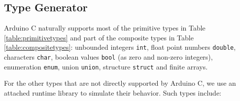 \subsection{Type Generator}

Arduino C naturally supports most of the primitive types in Table \ref{table:primitivetypes} and part of the composite types in Table \ref{table:compositetypes}: unbounded integers \texttt{int}, float point numbers \texttt{double}, characters \texttt{char}, boolean values \texttt{bool} (as zero and non-zero integers), enumeration \texttt{enum}, union \texttt{union}, structure \texttt{struct} and finite arrays.

For the other types that are not directly supported by Arduino C, we use an attached runtime library to simulate their behavior. Such types include:


